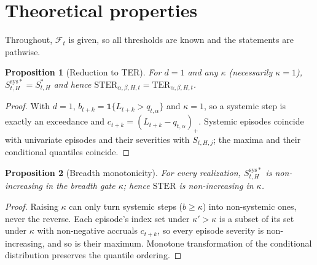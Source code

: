 \documentclass[11pt]{article}
\newtheorem{proposition}{Proposition}
\newcommand{\TER}{\mathrm{TER}}
\newcommand{\STER}{\mathrm{STER}}
\newcommand{\ind}{\mathbf{1}}
\begin{document}
\section{Theoretical properties}
Throughout, $\mathcal F_t$ is given, so all thresholds are known and the statements are pathwise.

\begin{proposition}[Reduction to TER]\label{prop:reduce}
For $d=1$ and any $\kappa$ (necessarily $\kappa=1$), $S^{\mathrm{sys}*}_{t,H}=S^{*}_{t,H}$ and hence
$\STER_{\alpha,\beta,H,t}=\TER_{\alpha,\beta,H,t}$.
\end{proposition}
\begin{proof}
With $d=1$, $b_{t+k}=\ind\{L_{t+k}>q_{t,\alpha}\}$ and $\kappa=1$, so a systemic step is exactly an
exceedance and $c_{t+k}=(L_{t+k}-q_{t,\alpha})_+$. Systemic episodes coincide with univariate episodes and
their severities with $S_{t,H,j}$; the maxima and their conditional quantiles coincide.
\end{proof}

\begin{proposition}[Breadth monotonicity]\label{prop:mono}
For every realization, $S^{\mathrm{sys}*}_{t,H}$ is non-increasing in the breadth gate $\kappa$; hence
$\STER$ is non-increasing in $\kappa$.
\end{proposition}
\begin{proof}
Raising $\kappa$ can only turn systemic steps ($b\ge\kappa$) into non-systemic ones, never the reverse. Each
episode's index set under $\kappa'>\kappa$ is a subset of its set under $\kappa$ with non-negative accruals
$c_{t+k}$, so every episode severity is non-increasing, and so is their maximum. Monotone transformation of
the conditional distribution preserves the quantile ordering.
\end{proof}
\end{document}
